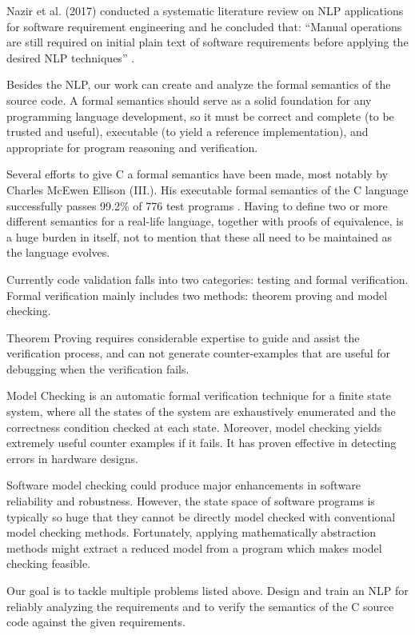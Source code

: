 \begin{multicols*}{2}
	Nazir et al. (2017) conducted a systematic literature review on \gls{NLP} applications for software requirement engineering and he concluded that: “Manual operations are still required on initial plain text of software requirements before applying the desired \gls{NLP} techniques” \cite{Nazir}.
	
	Besides the \gls{NLP}, our work can create and analyze the formal semantics of the source code.  A formal semantics should serve as a solid foundation for any programming language development, so it must be correct and complete (to be trusted and useful), executable (to yield a reference implementation), and appropriate for program reasoning and verification.
	
	Several efforts to give C a formal semantics have been made, most notably by Charles McEwen Ellison (III.). His executable formal semantics of the C language successfully passes  99.2\% of 776 test programs \cite{Ellison:2012:EFS:2103621.2103719}. Having to define two or more different semantics for a real-life language, together with proofs of equivalence, is a huge burden in itself, not to mention that these all need to be maintained as the language evolves.
	
	Currently code validation falls into two categories: testing and formal verification. Formal verification mainly includes two methods: theorem proving and model checking.
	
	Theorem Proving requires considerable expertise to guide and assist the verification process, and can not generate counter-examples that are useful for debugging when the verification fails.
	
	Model Checking \cite{Clarke:2000:MC:332656} is an automatic formal verification technique for a finite state system, where all the states of the system are exhaustively enumerated and the correctness condition checked at each state. Moreover, model checking yields extremely useful counter examples if it fails. It has proven effective in detecting errors in hardware designs.
	
	Software model checking could produce major enhancements in software reliability and robustness. However, the state space of software programs is typically so huge that they cannot be directly model checked with conventional model checking methods. Fortunately, applying mathematically abstraction methods might extract a reduced model from a program which makes model checking feasible.
	
	Our goal is to tackle multiple problems listed above. Design and train an \gls{NLP} for reliably analyzing the requirements and to verify the semantics of the C source code against the given requirements.
	
\end{multicols*}

